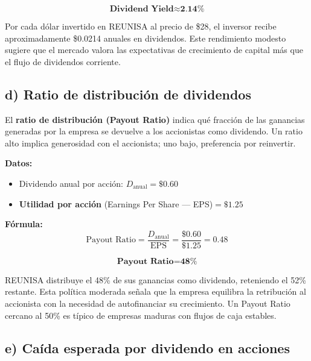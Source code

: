 \documentclass[12pt,a4paper]{article}
\begin{document}
\[
\textbf{Dividend Yield} \approx \textbf{2.14\%}
\]

\begin{interpretacion}
Por cada dólar invertido en REUNISA al precio de \$28, el inversor recibe
aproximadamente \$0.0214 anuales en dividendos. Este rendimiento modesto
sugiere que el mercado valora las expectativas de crecimiento de capital
más que el flujo de dividendos corriente.
\end{interpretacion}

\subsection*{d) Ratio de distribución de dividendos}

\begin{intuicion}
El \textbf{ratio de distribución (Payout Ratio)} indica qué fracción de las
ganancias generadas por la empresa se devuelve a los accionistas como
dividendo. Un ratio alto implica generosidad con el accionista; uno bajo,
preferencia por reinvertir.
\end{intuicion}

\textbf{Datos:}
\begin{itemize}
    \item Dividendo anual por acción: $D_{\text{anual}} = \$0.60$
    \item \textbf{Utilidad por acción} (Earnings Per Share --- EPS)$= \$1.25$
\end{itemize}

\textbf{Fórmula:}
\[
\text{Payout Ratio} = \frac{D_{\text{anual}}}{\text{EPS}}
= \frac{\$0.60}{\$1.25}
= 0.48
\]

\[
\textbf{Payout Ratio} = \textbf{48\%}
\]

\begin{interpretacion}
REUNISA distribuye el 48\% de sus ganancias como dividendo, reteniendo el
52\% restante. Esta política moderada señala que la empresa equilibra la
retribución al accionista con la necesidad de autofinanciar su crecimiento.
Un Payout Ratio cercano al 50\% es típico de empresas maduras con flujos
de caja estables.
\end{interpretacion}

\subsection*{e) Caída esperada por dividendo en acciones}
\end{document}
